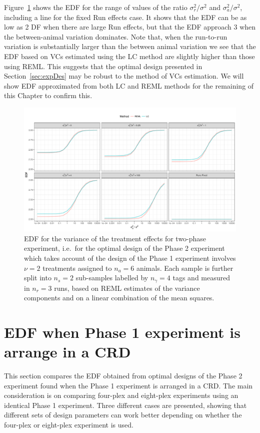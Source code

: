 Figure~\ref{fig:EDFadjusted} shows the EDF for the range of values of the ratio $\sigma_r^2/\sigma^2$ and $\sigma_a^2/\sigma^2$, including a line for the fixed Run effects case. It shows that the EDF can be as low as 2 DF when there are large Run effects, but that the EDF approach 3 when the between-animal variation dominates. Note that, when the run-to-run variation is substantially larger than the between animal variation we see that the EDF based on VCs estimated using the LC method are slightly higher than those using REML. This suggests that the optimal design presented in Section~\ref{sec:expDes} may be robust to the method of VCs estimation. We will show EDF approximated from both LC and REML methods for the remaining of this Chapter to confirm this. 

\begin{figure}[ht]
\centering
\includegraphics[width=1 \textwidth]{Chapter5/Graph/CRD232.pdf}
\caption{EDF for the variance of the treatment effects for two-phase experiment, i.e.\ for the optimal design of the Phase 2 experiment which takes account of the design of the Phase 1 experiment involves $\nu = 2$ treatments assigned to $n_a = 6$ animals. Each sample is further split into $n_s = 2$ sub-samples labelled by $n_\gamma = 4$ tags and measured in $n_r = 3$ runs, based on REML estimates of the variance components and on a linear combination of the mean squares.}
\label{fig:EDFadjusted}
\end{figure}

\section{EDF when Phase 1 experiment is arrange in a CRD}
\label{sec:expCRD}
This section compares the EDF obtained from optimal designs of the Phase 2 experiment found when the Phase 1 experiment is arranged in a CRD. The main consideration is on comparing four-plex and eight-plex experiments using an identical Phase 1 experiment. Three different cases are presented, showing that different sets of design parameters can work better depending on whether the four-plex or eight-plex experiment is used.

